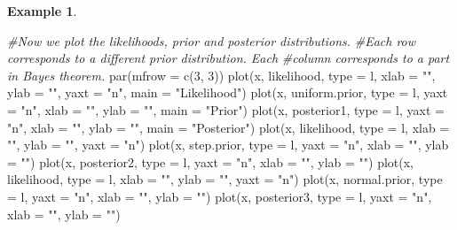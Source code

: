 \documentclass[
]{book}
\newenvironment{Shaded}{\begin{snugshade}}{\end{snugshade}}
\newcommand{\AttributeTok}[1]{\textcolor[rgb]{0.77,0.63,0.00}{#1}}
\newcommand{\CommentTok}[1]{\textcolor[rgb]{0.56,0.35,0.01}{\textit{#1}}}
\newcommand{\DecValTok}[1]{\textcolor[rgb]{0.00,0.00,0.81}{#1}}
\newcommand{\FunctionTok}[1]{\textcolor[rgb]{0.00,0.00,0.00}{#1}}
\newcommand{\NormalTok}[1]{#1}
\newcommand{\StringTok}[1]{\textcolor[rgb]{0.31,0.60,0.02}{#1}}
\theoremstyle{definition}
\theoremstyle{definition}
\newtheorem{example}{Example}[chapter]
\theoremstyle{definition}
\theoremstyle{definition}
\theoremstyle{remark}
\begin{document}
\begin{example}
\begin{Shaded}
\begin{Highlighting}[]
\CommentTok{\#Now we plot the likelihoods, prior and posterior distributions. }
\CommentTok{\#Each row corresponds to a different prior distribution. Each}
\CommentTok{\#column corresponds to a part in Bayes\textquotesingle{} theorem. }
\FunctionTok{par}\NormalTok{(}\AttributeTok{mfrow =} \FunctionTok{c}\NormalTok{(}\DecValTok{3}\NormalTok{, }\DecValTok{3}\NormalTok{))}
\FunctionTok{plot}\NormalTok{(x, likelihood, }\AttributeTok{type =} \StringTok{\textquotesingle{}l\textquotesingle{}}\NormalTok{, }\AttributeTok{xlab =} \StringTok{""}\NormalTok{, }\AttributeTok{ylab =} \StringTok{""}\NormalTok{, }\AttributeTok{yaxt =} \StringTok{"n"}\NormalTok{, }\AttributeTok{main =} \StringTok{"Likelihood"}\NormalTok{)}
\FunctionTok{plot}\NormalTok{(x, uniform.prior, }\AttributeTok{type =} \StringTok{\textquotesingle{}l\textquotesingle{}}\NormalTok{, }\AttributeTok{yaxt =} \StringTok{"n"}\NormalTok{, }\AttributeTok{xlab =} \StringTok{""}\NormalTok{, }\AttributeTok{ylab =} \StringTok{""}\NormalTok{, }\AttributeTok{main =} \StringTok{"Prior"}\NormalTok{)}
\FunctionTok{plot}\NormalTok{(x, posterior1, }\AttributeTok{type =} \StringTok{\textquotesingle{}l\textquotesingle{}}\NormalTok{, }\AttributeTok{yaxt =} \StringTok{"n"}\NormalTok{, }\AttributeTok{xlab =} \StringTok{""}\NormalTok{, }\AttributeTok{ylab =} \StringTok{""}\NormalTok{, }\AttributeTok{main =} \StringTok{"Posterior"}\NormalTok{)}
\FunctionTok{plot}\NormalTok{(x, likelihood, }\AttributeTok{type =} \StringTok{\textquotesingle{}l\textquotesingle{}}\NormalTok{, }\AttributeTok{xlab =} \StringTok{""}\NormalTok{, }\AttributeTok{ylab =} \StringTok{""}\NormalTok{, }\AttributeTok{yaxt =} \StringTok{"n"}\NormalTok{)}
\FunctionTok{plot}\NormalTok{(x, step.prior, }\AttributeTok{type =} \StringTok{\textquotesingle{}l\textquotesingle{}}\NormalTok{, }\AttributeTok{yaxt =} \StringTok{"n"}\NormalTok{, }\AttributeTok{xlab =} \StringTok{""}\NormalTok{, }\AttributeTok{ylab =} \StringTok{""}\NormalTok{)}
\FunctionTok{plot}\NormalTok{(x, posterior2, }\AttributeTok{type =} \StringTok{\textquotesingle{}l\textquotesingle{}}\NormalTok{, }\AttributeTok{yaxt =} \StringTok{"n"}\NormalTok{, }\AttributeTok{xlab =} \StringTok{""}\NormalTok{, }\AttributeTok{ylab =} \StringTok{""}\NormalTok{)}
\FunctionTok{plot}\NormalTok{(x, likelihood, }\AttributeTok{type =} \StringTok{\textquotesingle{}l\textquotesingle{}}\NormalTok{, }\AttributeTok{xlab =} \StringTok{""}\NormalTok{, }\AttributeTok{ylab =} \StringTok{""}\NormalTok{, }\AttributeTok{yaxt =} \StringTok{"n"}\NormalTok{)}
\FunctionTok{plot}\NormalTok{(x, normal.prior, }\AttributeTok{type =} \StringTok{\textquotesingle{}l\textquotesingle{}}\NormalTok{, }\AttributeTok{yaxt =} \StringTok{"n"}\NormalTok{, }\AttributeTok{xlab =} \StringTok{""}\NormalTok{, }\AttributeTok{ylab =} \StringTok{""}\NormalTok{)}
\FunctionTok{plot}\NormalTok{(x, posterior3, }\AttributeTok{type =} \StringTok{\textquotesingle{}l\textquotesingle{}}\NormalTok{, }\AttributeTok{yaxt =} \StringTok{"n"}\NormalTok{, }\AttributeTok{xlab =} \StringTok{""}\NormalTok{, }\AttributeTok{ylab =} \StringTok{""}\NormalTok{)}
\end{Highlighting}
\end{Shaded}


\end{example}
\end{document}
